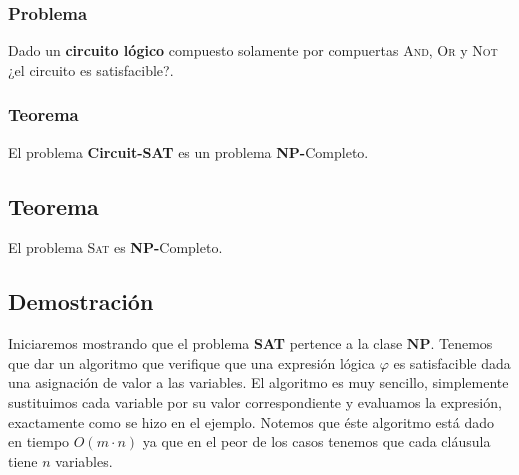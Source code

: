 \documentclass[a4paper]{article}
\begin{document}
\subsubsection{Problema}
\noindent
Dado un \textbf{circuito lógico} compuesto solamente por compuertas \textsc{And, Or} y \textsc{Not} ¿el circuito es satisfacible?.
\subsubsection{Teorema}
\noindent
El problema \textbf{Circuit-SAT} es un problema \textbf{NP-}Completo.
\subsection{Teorema}
\noindent
El problema \textsc{Sat} es \textbf{NP-}Completo.
\newpage
\subsection{Demostración}
\noindent
Iniciaremos mostrando que el problema \textbf{SAT} pertence a la clase \(\mathbf{NP}\). 
\newline 
Tenemos que dar un algoritmo que verifique que una expresión lógica \(\varphi\) es satisfacible dada una 
asignación de valor a las variables. El algoritmo es muy sencillo, simplemente sustituimos cada variable 
por su valor correspondiente y evaluamos la expresión, exactamente como se hizo en el ejemplo. Notemos que 
éste algoritmo está dado en tiempo \(O\left(m \cdot n\right)\)  ya que en el peor de los casos tenemos que 
cada cláusula tiene \(n\) variables. 
\newline 
\end{document}
